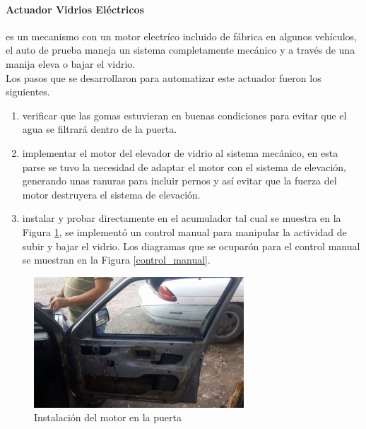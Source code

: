\paragraph{Actuador Vidrios Eléctricos} es un mecanismo con un motor electríco incluido de fábrica en algunos vehículos, el auto de prueba maneja un sistema completamente mecánico y a través de una manija eleva o bajar el vidrio.\\

Los pasos que se desarrollaron para automatizar este actuador fueron los siguientes.\\

\begin{enumerate}
\item verificar que las gomas estuvieran en buenas condiciones para evitar que el agua se filtrará dentro de la puerta.\\
\item implementar el motor del elevador de vidrio al sistema mecánico, en esta parse se tuvo la necesidad de adaptar el motor con el sistema de elevación, generando unas ranuras para incluir pernos y así evitar que la fuerza del motor destruyera el sistema de elevación.\\
\item instalar y probar directamente en el acumulador tal cual se muestra en la Figura \ref{subirvidrio}, se implementó un control manual para manipular la actividad de subir y bajar el vidrio. Los diagramas que se ocuparón para el control manual se muestran en la Figura \ref{control_manual}.

\end{enumerate}





\begin{figure}[H]
\centering
\includegraphics[width=0.7\textwidth]{metodologia/subirvidrio.jpg}
\caption{Instalación del motor en la puerta}
\label{subirvidrio}
\end{figure}

